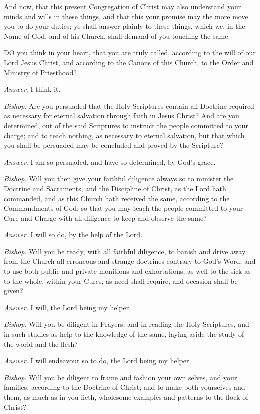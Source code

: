 And now, that this present Congregation of Christ
may also understand your minds and wills in these things, and that this
your promise may the more move you to do your duties; ye shall answer
plainly to these things, which we, in the Name of God, and of his Church,
shall demand of you touching the same.

DO
you think in your heart, that you are truly called, according to the will
of our Lord Jesus Christ, and according to the Canons of this Church,
to the Order and Ministry of Priesthood?

\emph{Answer}. I think it.

\emph{Bishop}. Are you persuaded that the Holy
Scriptures contain all Doctrine required as necessary for eternal salvation
through faith in Jesus Christ? And are you determined, out of the said
Scriptures to instruct the people committed to your charge; and to teach
nothing, as necessary to eternal salvation, but that which you shall be
persuaded may be concluded and proved by the Scripture?

\emph{Answer}. I am so persuaded, and have so
determined, by God’s grace.

\emph{Bishop}. Will you then give your faithful
diligence always so to minister the Doctrine and Sacraments, and the Discipline
of Christ, as the Lord hath commanded, and as this Church hath received
the same, according to the Commandments of God; so that you may teach
the people committed to your Cure and Charge with all diligence to keep
and observe the same?

\emph{Answer}. I will so do, by the help of the Lord.

\emph{Bishop}. Will you be ready, with all faithful
diligence, to banish and drive away from the Church all erroneous and
strange doctrines contrary to God's Word; and to use both public and private
monitions and exhortations, as well to the sick as to the whole, within
your Cures, as need shall require, and occasion shall be given?

\emph{Answer}. I will, the Lord being my helper.

\emph{Bishop}. Will you be diligent in Prayers, and
in reading the Holy Scriptures, and in such studies as help to the knowledge
of the same, laying aside the study of the world and the flesh?

\emph{Answer}. I will endeavour so to do, the
Lord being my helper.

\emph{Bishop}. Will you be diligent to frame
and fashion your own selves, and your families, according to the Doctrine
of Christ; and to make both yourselves and them, as much as in you lieth,
wholesome examples and patterns to the flock of Christ?

